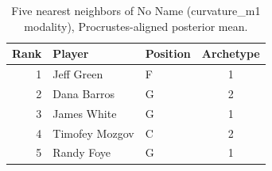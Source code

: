 \begin{table}[htbp]
  \centering\small
  \begin{tabular}{rllc}
    \toprule
    Rank & Player & Position & Archetype \\
    \midrule
    1 & Jeff Green & F & 1 \\
    2 & Dana Barros & G & 2 \\
    3 & James White & G & 1 \\
    4 & Timofey Mozgov & C & 2 \\
    5 & Randy Foye & G & 1 \\
    \bottomrule
  \end{tabular}
  \caption{Five nearest neighbors of No Name (curvature_m1 modality), Procrustes-aligned posterior mean.}
  \label{tab:No_Name_neighbors_curvature_m1}
\end{table}

